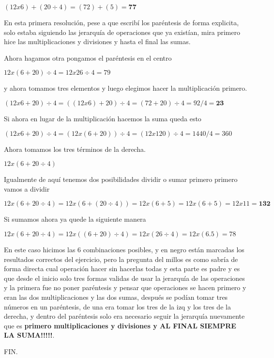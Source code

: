 \documentclass[10pt]{article}
\newcommand{\bt}[1]{\textbf{#1}}
\newcommand{\ec}[1]{\begin{center} $#1$ \end{center}}
\begin{document}
    \ec{(12x6)+(20\div4)=(72)+(5)=\bt{77}}

    En esta primera resolución, pese a que escribí los paréntesis de forma explicita, solo estaba siguiendo las jerarquía de operaciones que ya existían, mira primero hice las multiplicaciones y divisiones y hasta el final las sumas.

    Ahora hagamos otra pongamos el paréntesis en el centro

    \ec{12x(6+20)\div4=12x26\div4=79}

    y ahora tomamos tres elementos y luego elegimos hacer la multiplicación primero.

    \ec{(12x6+20)\div4=((12x6)+20)\div4=(72+20)\div4=92/4=\bt{23}}

    Si ahora en lugar de la multiplicación hacemos la suma queda esto

    \ec{(12x6+20)\div4=(12x(6+20))\div4=(12x120)\div4=1440/4=360}

    Ahora tomamos los tres términos de la derecha.

    \ec{12x(6+20\div4)}

    Igualmente de aquí tenemos dos posibilidades dividir o sumar primero primero vamos a dividir 

    \ec{12x(6+20\div4)=12x(6+(20\div4))=12x(6+5)=12x(6+5)=12x11=\bt{132}}

    Si sumamos ahora ya quede la siguiente manera

    \ec{12x(6+20\div4)=12x((6+20)\div4)=12x(26\div4)=12x(6.5)=78}

    En este caso hicimos las 6 combinaciones posibles, y en negro están marcadas los resultados correctos del ejercicio, pero la pregunta del millos es como sabría de forma directa cual operación hacer sin hacerlas todas y esta parte es padre y es que desde el inicio solo tres formas validas de usar la jerarquía de las operaciones y la primera fue no poner paréntesis y pensar que operaciones se hacen primero y eran las dos multiplicaciones y las dos sumas, después se podían tomar tres números en un paréntesis, de una era tomar los tres de la izq y los tres de la derecha, y dentro del paréntesis solo era necesario seguir la jerarquía nuevamente que es \bt{primero multiplicaciones y divisiones y AL FINAL SIEMPRE LA SUMA!!!!!}.

    FIN.









    












\end{document}
